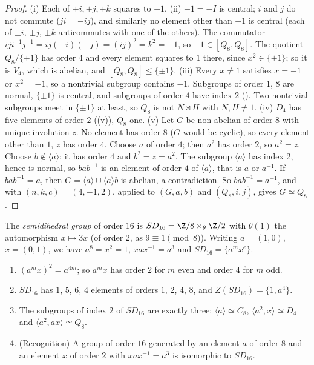 \begin{proof}
(i) Each of $\pm i,\pm j,\pm k$ squares to $-1$. (ii) $-1=-I$ is central; $i$ and $j$ do not commute ($ji=-ij$), and similarly no element
other than $\pm1$ is central (each of $\pm i$, $\pm j$, $\pm k$ anticommutes with one of the others). The commutator $iji^{-1}j^{-1}=ij(-i)(-j)=(ij)^2=k^2=-1$,
so $-1\in[Q_8,Q_8]$. The quotient $Q_8/\{\pm1\}$ has order $4$ and every element squares to $1$ there, since $x^2\in\{\pm1\}$; so it is $V_4$, which is
abelian, and $[Q_8,Q_8]\le\{\pm1\}$. (iii) Every $x\ne1$ satisfies $x=-1$ or $x^2=-1$, so a nontrivial subgroup contains $-1$. Subgroups of
order $1$, $8$ are normal, $\{\pm1\}$ is central, and subgroups of order $4$ have index $2$ (). Two nontrivial subgroups
meet in $\{\pm1\}$ at least, so $Q_8$ is not $N\rtimes H$ with $N,H\ne1$. (iv) $D_4$ has five elements of order $2$ ((v)),
$Q_8$ one. (v) Let $G$ be non-abelian of order $8$ with unique involution $z$. No element has order $8$ ($G$ would be cyclic), so every
element other than $1$, $z$ has order $4$. Choose $a$ of order $4$; then $a^2$ has order $2$, so $a^2=z$. Choose $b\notin\langle a\rangle$; it has order $4$ and
$b^2=z=a^2$. The subgroup $\langle a\rangle$ has index $2$, hence is normal, so $bab^{-1}$ is an element of order $4$ of $\langle a\rangle$, that is $a$ or $a^{-1}$.
If $bab^{-1}=a$, then $G=\langle a\rangle\cup\langle a\rangle b$ is abelian, a contradiction. So $bab^{-1}=a^{-1}$, and  with
$(n,k,c)=(4,-1,2)$, applied to $(G,a,b)$ and $(Q_8,i,j)$, gives $G\simeq Q_8$.
\end{proof}

\begin{definition}\label{def:groups:semidihedral}
The \emph{semidihedral group} of order $16$ is $SD_{16}=\Z/8\rtimes_\theta\Z/2$ with $\theta(1)$ the automorphism $x\mapsto3x$ (of order $2$, as
$9\equiv1\pmod8$). Writing $a=(1,0)$, $x=(0,1)$, we have $a^8=x^2=1$, $xax^{-1}=a^3$ and $SD_{16}=\{a^mx^e\}$.
\end{definition}

\begin{proposition}\label{prop:groups:semidihedral}
\begin{enumerate}[label=(\roman*)]
\item $(a^mx)^2=a^{4m}$; so $a^mx$ has order $2$ for $m$ even and order $4$ for $m$ odd.
\item $SD_{16}$ has $1$, $5$, $6$, $4$ elements of orders $1$, $2$, $4$, $8$, and $Z(SD_{16})=\{1,a^4\}$.
\item The subgroups of index $2$ of $SD_{16}$ are exactly three: $\langle a\rangle\simeq C_8$, $\langle a^2,x\rangle\simeq D_4$ and $\langle a^2,ax\rangle\simeq Q_8$.
\item (Recognition) A group of order $16$ generated by an element $a$ of order $8$ and an element $x$ of order $2$ with $xax^{-1}=a^3$ is
isomorphic to $SD_{16}$.
\end{enumerate}
\end{proposition}

